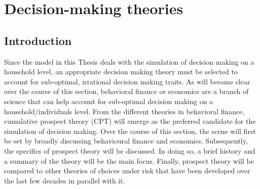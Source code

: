 \section{{Decision-making theories}} \label{Prospect}
\subsection{\large{Introduction}} 
Since the model in this Thesis deals with the simulation of decision making on a household level, an appropriate decision making theory must be selected to account for sub-optimal, irrational decision making traits. As will become clear over the course of this section, behavioral finance or economics are a branch of science that can help account for sub-optimal decision making on a household/individuals level. From the different theories in behavioral finance, cumulative prospect theory (CPT) will emerge as the preferred candidate for the simulation of decision making. 
\newline
\newline
Over the course of this section, the scene will first be set by broadly discussing behavioural finance and economics. Subsequently, the specifics of prospect theory will be discussed. In doing so, a brief history and a summary of the theory will be the main focus. Finally, prospect theory will be compared to other theories of choices under risk that have been developed over the last few decades in parallel with it. 
